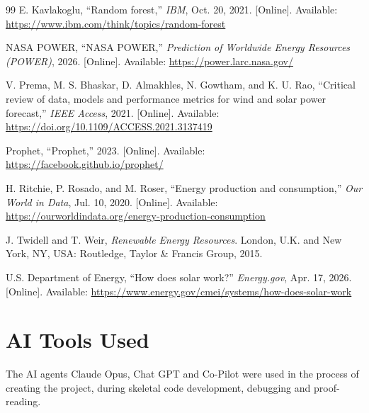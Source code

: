 \documentclass[conference]{IEEEtran}
\begin{document}
\begin{thebibliography}{99}
E. Kavlakoglu, ``Random forest,'' \emph{IBM}, Oct. 20, 2021. [Online]. Available: \url{https://www.ibm.com/think/topics/random-forest}

NASA POWER, ``NASA POWER,'' \emph{Prediction of Worldwide Energy Resources (POWER)}, 2026. [Online]. Available: \url{https://power.larc.nasa.gov/}

V. Prema, M. S. Bhaskar, D. Almakhles, N. Gowtham, and K. U. Rao, ``Critical review of data, models and performance metrics for wind and solar power forecast,'' \emph{IEEE Access}, 2021. [Online]. Available: \url{https://doi.org/10.1109/ACCESS.2021.3137419}

Prophet, ``Prophet,'' 2023. [Online]. Available: \url{https://facebook.github.io/prophet/}

H. Ritchie, P. Rosado, and M. Roser, ``Energy production and consumption,'' \emph{Our World in Data}, Jul. 10, 2020. [Online]. Available: \url{https://ourworldindata.org/energy-production-consumption}

J. Twidell and T. Weir, \emph{Renewable Energy Resources}. London, U.K. and New York, NY, USA: Routledge, Taylor \& Francis Group, 2015.

U.S. Department of Energy, ``How does solar work?'' \emph{Energy.gov}, Apr. 17, 2026. [Online]. Available: \url{https://www.energy.gov/cmei/systems/how-does-solar-work}

\end{thebibliography}
\appendix
\section*{AI Tools Used}
The AI agents Claude Opus, Chat GPT and Co-Pilot were used in the process of creating the project, during skeletal code development, debugging and proof-reading. 
\end{document}
